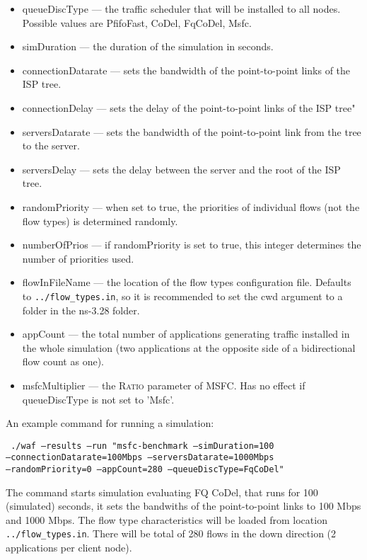 \begin{itemize}
	\item queueDiscType --- the traffic scheduler that will be installed to all nodes. Possible values are PfifoFast, CoDel, FqCoDel, Msfc.
	\item simDuration --- the duration of the simulation in seconds.
	\item connectionDatarate --- sets the bandwidth of the point-to-point links of the ISP tree.
	\item connectionDelay --- sets the delay of the point-to-point links of the ISP tree"
	\item serversDatarate --- sets the bandwidth of the point-to-point link from the tree to the server.
	\item serversDelay --- sets the delay between the server and the root of the ISP tree.
	\item randomPriority --- when set to true, the priorities of individual flows (not the flow types) is determined randomly.
	\item numberOfPrios --- if randomPriority is set to true, this integer determines the number of priorities used.
	\item flowInFileName --- the location of the flow types configuration file. Defaults to \texttt{\small ../flow\_types.in}, so it is recommended to set the cwd argument to a folder in the ns-3.28 folder.
	\item appCount --- the total number of applications generating traffic installed in the whole simulation (two applications at the opposite side of a bidirectional flow count as one).
	\item msfcMultiplier --- the \textsc{Ratio} parameter of MSFC. Has no effect if queueDiscType is not set to 'Msfc'.
\end{itemize}

An example command for running a simulation:

\vspace{3mm}
\texttt{\small
./waf --results --run "msfc-benchmark --simDuration=100 \\ --connectionDatarate=100Mbps --serversDatarate=1000Mbps \\ --randomPriority=0 --appCount=280 --queueDiscType=FqCoDel"
}
\vspace{3mm}

The command starts simulation evaluating FQ CoDel, that runs for 100 (simulated) seconds, it sets the bandwiths of the point-to-point links to 100 Mbps and 1000 Mbps. The flow type characteristics will be loaded from location \texttt{\small ../flow\_types.in}. There will be total of 280 flows in the down direction (2 applications per client node). 

